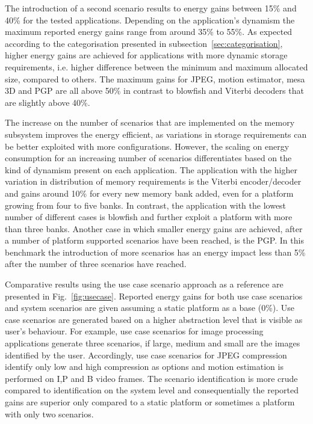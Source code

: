 \documentclass[a4paper,conference]{IEEEtran}
\begin{document}
The introduction of a second scenario results to energy gains between 15\% and  40\%  for the tested applications. Depending on the application's dynamism the maximum reported energy gains range from around 35\% to 55\%. As expected according to the categorisation presented in subsection~\ref{sec:categorisation}, higher energy gains are achieved for applications with more dynamic storage requirements, i.e. higher difference between the minimum and maximum allocated size, compared to others. The maximum gains for JPEG, motion estimator, mesa 3D and PGP are all above 50\% in contrast to blowfish and Viterbi decoders that are slightly above 40\%.

The increase on the number of scenarios that are implemented on the memory subsystem improves the energy efficient, as variations in storage requirements can be better exploited with more configurations. However, the scaling on energy consumption for an increasing number of scenarios differentiates based on the kind of dynamism present on each application. The application with the higher variation in distribution of memory requirements is the Viterbi encoder/decoder and gains around 10\% for every new memory bank added, even for a platform growing from four to five banks. In contrast, the application with the lowest number of different cases is blowfish and further exploit a platform with more than three banks. Another case in which smaller energy gains are achieved, after a number of platform supported scenarios have been reached, is the PGP. In this benchmark the introduction of more scenarios has an energy impact less than 5\% after the number of three scenarios have reached.

Comparative results using the use case scenario approach as a reference are presented in Fig.~\ref{fig:usecase}. Reported energy gains for both use case scenarios and system scenarios are given assuming a static platform as a base (0\%). Use case scenarios are generated based on a higher abstraction level that is visible as user's behaviour. For example, use case scenarios for image processing applications generate three scenarios, if large, medium and small are the images identified by the user. Accordingly, use case scenarios for JPEG compression identify only low and high compression as options and motion estimation is performed on I,P and B video frames. The scenario identification is more crude compared to identification on the system level and consequentially the reported gains are superior only compared to a static platform or sometimes a platform with only two scenarios.  
\end{document}
